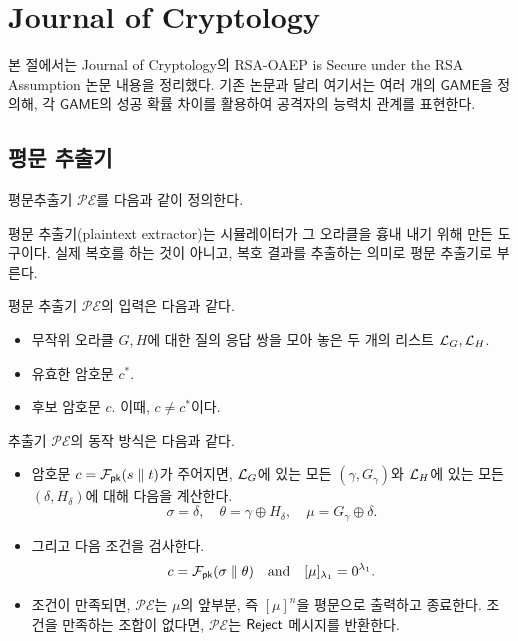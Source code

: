 
\section{Journal of Cryptology}

\newcommand{\game}{\textsf{GAME}}
\newcommand{\pe}{\mathcal{PE}}
\newcommand{\glist}{\mathcal{L}_{G}}
\newcommand{\hlist}{\mathcal{L}_{H}}

본 절에서는 Journal of Cryptology의 RSA-OAEP is Secure under the RSA Assumption
논문 내용을 정리했다. 기존 논문과 달리 여기서는 여러 개의 $\game$을 정의해, 각
$\game$의 성공 확률 차이를 활용하여 공격자의 능력치 관계를 표현한다.


\subsection{평문 추출기}

평문추출기 $\pe$를 다음과 같이 정의한다.

\begin{memo}
	평문 추출기(plaintext extractor)는 시뮬레이터가 그 오라클을 흉내 내기 위해
	만든 도구이다. 실제 복호를 하는 것이 아니고, 복호 결과를 추출하는 의미로
	평문 추출기로 부른다.
\end{memo}

\begin{tcolorbox}
	평문 추출기 $\pe$의 입력은 다음과 같다.
	\begin{itemize}
		\item 무작위 오라클 $G, H$에 대한 질의 응답 쌍을 모아 놓은 두 개의
		리스트 $\mathcal{L}_{G}, \mathcal{L}_{H}$.
		\item 유효한 암호문 $c^*$.
		\item 후보 암호문 $c$. 이때, $c \ne c^*$이다.
	\end{itemize}
	추출기 $\pe$의 동작 방식은 다음과 같다.
	\begin{itemize}
		\item 암호문 $c = \mathcal{F}_{\textsf{pk}}(s \parallel t)$가 주어지면, $\mathcal{L}_{G}$에 있는 모든
		$(\gamma, G_\gamma)$와 $\mathcal{L}_{H}$에 있는 모든 $(\delta, H_\delta)$에 대해
		다음을 계산한다. 
		$$
		\sigma = \delta,\quad \theta = \gamma \oplus H_\delta,\quad \mu = G_\gamma \oplus \delta.
		$$
		\item 그리고 다음 조건을 검사한다.
		$$
			c = \mathcal{F}_{\textsf{pk}}(\sigma \parallel \theta) \quad \text{and} \quad [\mu]_{\lambda_1} = 0^{\lambda_1}.
		$$
		\item 조건이 만족되면, $\pe$는 $\mu$의 앞부분, 즉 $[\mu]^n$을 평문으로
		출력하고 종료한다. 조건을 만족하는 조합이 없다면, $\pe$는 $\textsf{Reject}$
		메시지를 반환한다.
	\end{itemize}
\end{tcolorbox}

